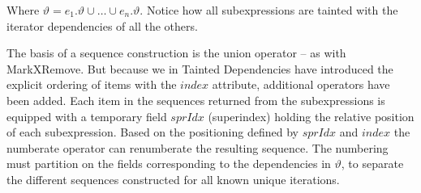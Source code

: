 Where $\vartheta=e_{1}.\vartheta \cup \ldots \cup e_{n}.\vartheta$. Notice how all subexpressions are tainted with
the iterator dependencies of all the others.

The basis of a sequence construction is the \textsf{union} operator -- as with MarkXRemove. But because we in
Tainted Dependencies have introduced the explicit ordering of items with the $index$ attribute, additional
operators have been added. Each item in the sequences returned from the subexpressions is equipped with a
temporary field $sprIdx$ (superindex) holding the relative position of each subexpression. Based on the
positioning defined by $sprIdx$ and $index$ the \textsf{numberate} operator can renumberate the resulting
sequence. The numbering must partition on the fields corresponding to the dependencies in $\vartheta$, to separate
the different sequences constructed for all known unique iterations.


